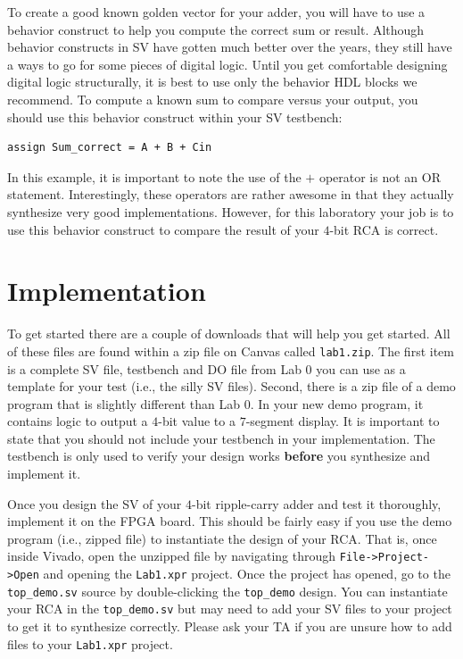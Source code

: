 \documentclass{article}
\begin{document}
To create a good known golden vector for your adder, you will have to
use a behavior construct to help you compute the correct sum or
result.  Although
behavior constructs in SV have gotten much better over the
years, they still have a ways to go for some pieces of digital logic.
Until you get comfortable designing digital logic structurally, it is
best to use only the behavior HDL blocks we recommend.  To compute a
known sum to compare versus your output, you should
use this behavior construct within your SV testbench:
\begin{verbatim}
assign Sum_correct = A + B + Cin
\end{verbatim}
In this example, it is important to note the use of the $+$ operator
is not an OR statement.  Interestingly, these operators
are rather awesome in that they actually synthesize very good
implementations.  However, for this laboratory your job is to use this
behavior construct to compare the result of your $4$-bit RCA is
correct.

\section{Implementation}

To get started there are a couple of downloads that will help you
get started.  All of these files are found within a zip file on Canvas
called \verb!lab1.zip!.
The first item is a complete SV file, testbench and DO
file from Lab 0 you can use as a template for your test (i.e., the
silly SV files).   
Second, there is a zip
file of a demo program that is slightly different than Lab 0.  In your
new demo program, it contains logic to output a $4$-bit value to a
$7$-segment display.  
It is important to state that you should not include your testbench in
your implementation. The testbench is only used to verify your design
works \textbf{before} you synthesize and implement it.

Once you design the SV of your $4$-bit ripple-carry adder
and test it thoroughly, implement it on the
FPGA board.  This should be fairly easy if you use the demo program
(i.e., zipped file) to instantiate the design of your RCA.
That is, once inside Vivado, open the unzipped file by navigating
through \verb!File->Project->Open! and opening the \verb!Lab1.xpr!
project.  Once the project has opened, go to the \verb!top_demo.sv!
source by double-clicking the \verb!top_demo!
design.  You can instantiate your RCA in the \verb!top_demo.sv! but
may need to add your SV files to your project to get it to synthesize
correctly.
Please ask your TA if you are unsure
how to add files to your \verb!Lab1.xpr! project.
\end{document}
